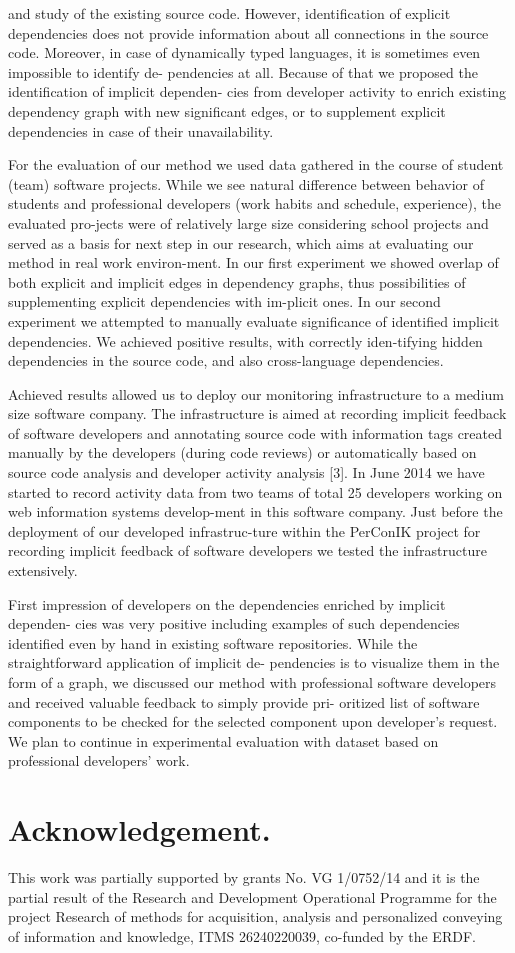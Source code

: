\documentclass[a4paper]{llncs}
\begin{document}
\newpage\noindent
and study of the existing source code. However, identification of explicit dependencies does not provide information about all connections in the source code. Moreover, in case of dynamically typed languages, it is sometimes even impossible to identify de- pendencies at all. Because of that we proposed the identification of implicit dependen- cies from developer activity to enrich existing dependency graph with new significant edges, or to supplement explicit dependencies in case of their unavailability.

For the evaluation of our method we used data gathered in the course of student (team) software projects. While we see natural difference between behavior of students and professional developers (work habits and schedule, experience), the evaluated pro-jects were of relatively large size considering school projects and served as a basis for next step in our research, which aims at evaluating our method in real work environ-ment. In our first experiment we showed overlap of both explicit and implicit edges in dependency graphs, thus possibilities of supplementing explicit dependencies with im-plicit ones. In our second experiment we attempted to manually evaluate significance of identified implicit dependencies. We achieved positive results, with correctly iden-tifying hidden dependencies in the source code, and also cross-language dependencies.

Achieved results allowed us to deploy our monitoring infrastructure to a medium size software company. The infrastructure is aimed at recording implicit feedback of software developers and annotating source code with information tags created manually by the developers (during code reviews) or automatically based on source code analysis and developer activity analysis [3]. In June 2014 we have started to record activity data from two teams of total 25 developers working on web information systems develop-ment in this software company. Just before the deployment of our developed infrastruc-ture within the PerConIK project for recording implicit feedback of software developers we tested the infrastructure extensively.

First impression of developers on the dependencies enriched by implicit dependen- cies was very positive including examples of such dependencies identified even by hand in existing software repositories. While the straightforward application of implicit de- pendencies is to visualize them in the form of a graph, we discussed our method with professional software developers and received valuable feedback to simply provide pri- oritized list of software components to be checked for the selected component upon developer’s request. We plan to continue in experimental evaluation with dataset based on professional developers’ work.

\section*{Acknowledgement.}
This work was partially supported by grants No. VG 1/0752/14 and it is the partial result of the Research and Development Operational Programme for the project Research of methods for acquisition, analysis and personalized conveying of information and knowledge, ITMS 26240220039, co-funded by the ERDF. 
\end{document}
